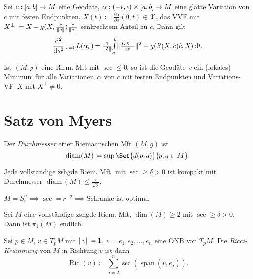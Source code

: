 \documentclass{cheat-sheet}
\newcommand{\vinterval}{\ointerval{-\epsilon}{\epsilon}} %
\DeclareMathOperator{\Span}{span} %
\DeclareMathOperator{\diam}{diam} %
\DeclareMathOperator{\Ric}{Ric} %
\newcommand{\abinterval}{\cinterval{a}{b}} %
\newcommand{\VF}{\mathcal{X}} %
\begin{document}
\begin{satz}
  Sei $c: \abinterval \to M$ eine Geodäte, $\alpha : \vinterval \times \abinterval \to M$ eine glatte Variation von $c$ mit festen Endpunkten, $X(t) \coloneqq \tfrac{\partial \alpha}{\partial s}(0, t) \in \VF_c$ das VVF mit $X^\perp \coloneqq X - g(X, \tfrac{\dot{c}}{\lVert\dot{c}\rVert}) \tfrac{\dot{c}}{\lVert\dot{c}\rVert}$ senkrechtem Anteil zu $\dot{c}$. Dann gilt
  \[
    \frac{\mathrm{d}^2}{\mathrm{d} s^2} |_{s=0} L(\alpha_s) = \tfrac{1}{\lVert\dot{c}\rVert} {\textstyle \int\limits_{a}^{b}} \lVert\tfrac{D X^\perp}{\mathrm{d} t}\rVert^2 - g(R(X,\dot{c})\dot{c},X) \,\mathrm{d} t.
  \]
\end{satz}

\begin{kor}
  Ist $(M, g)$ eine Riem. Mft mit $\sec \leq 0$, so ist die Geodäte~$c$ ein (lokales) Minimum für alle Variationen~$\alpha$ von $c$ mit festen Endpunkten und Variations-VF~$X$ mit $X^\perp \neq 0$.
\end{kor}

\section{Satz von Myers}

\begin{defn}
  Der \emph{Durchmesser} einer Riemannschen Mft $(M, g)$ ist
  \[ \diam(M) \coloneqq \sup \Set{d(p,q)}{ p,q \in M }. \]
\end{defn}

\begin{satz}
  Jede vollständige zshgde Riem. Mft. mit $\sec \geq \delta > 0$ ist kompakt mit Durchmesser $\diam(M) \leq \tfrac{\pi}{\sqrt{\delta}}$.
\end{satz}

\begin{bem}
  $M = S_r^n \implies \sec = r^{-2} \implies \text{Schranke ist optimal}$
\end{bem}

\begin{kor}
  Sei $M$ eine vollständige zshgde Riem. Mft, $\dim(M) \geq 2$ mit $\sec \geq \delta > 0$. Dann ist $\pi_1(M)$ endlich.
\end{kor}

\begin{defn}
  Sei $p \in M$, $v \in T_p M$ mit $\lVert v\rVert = 1$, $v = e_1, e_2, \ldots, e_n$ eine ONB von $T_p M$. Die \emph{Ricci-Krümmung} von $M$ in Richtung $v$ ist dann
  \[
    \Ric(v) \coloneqq \sum_{j=2}^n \sec(\Span(v, e_j)).
  \]
\end{defn}
\end{document}
